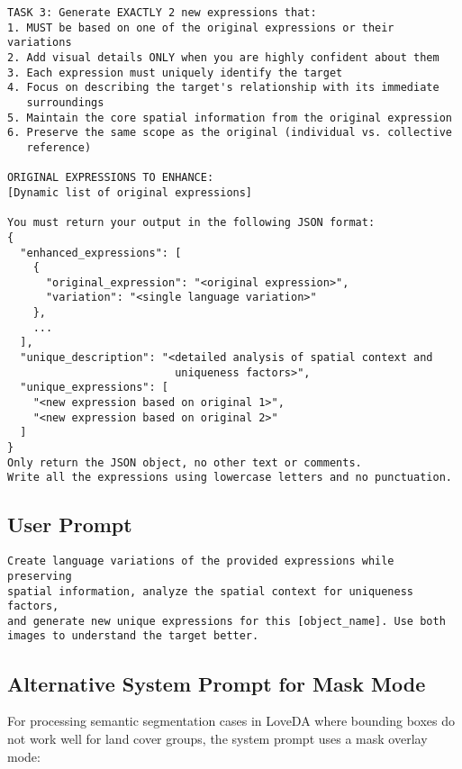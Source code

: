 \begin{small}
\begin{verbatim}
TASK 3: Generate EXACTLY 2 new expressions that:
1. MUST be based on one of the original expressions or their variations
2. Add visual details ONLY when you are highly confident about them
3. Each expression must uniquely identify the target
4. Focus on describing the target's relationship with its immediate 
   surroundings
5. Maintain the core spatial information from the original expression
6. Preserve the same scope as the original (individual vs. collective 
   reference)

ORIGINAL EXPRESSIONS TO ENHANCE:
[Dynamic list of original expressions]

You must return your output in the following JSON format:
{
  "enhanced_expressions": [
    {
      "original_expression": "<original expression>",
      "variation": "<single language variation>"
    },
    ...
  ],
  "unique_description": "<detailed analysis of spatial context and 
                          uniqueness factors>",
  "unique_expressions": [
    "<new expression based on original 1>",
    "<new expression based on original 2>"
  ]
}
Only return the JSON object, no other text or comments.
Write all the expressions using lowercase letters and no punctuation.
\end{verbatim}
\end{small}

\subsection{User Prompt}

\begin{small}
\begin{verbatim}
Create language variations of the provided expressions while preserving 
spatial information, analyze the spatial context for uniqueness factors, 
and generate new unique expressions for this [object_name]. Use both 
images to understand the target better.
\end{verbatim}
\end{small}

\subsection{Alternative System Prompt for Mask Mode}

For processing semantic segmentation cases in LoveDA where bounding boxes do not work well for land cover groups, the system prompt uses a mask overlay mode:

